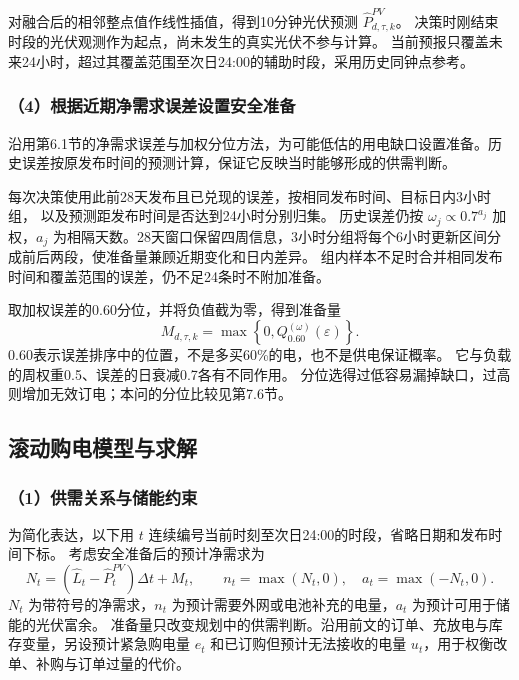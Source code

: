 对融合后的相邻整点值作线性插值，得到10分钟光伏预测 $\widehat P^{PV}_{d,\tau,k}$。
决策时刚结束时段的光伏观测作为起点，尚未发生的真实光伏不参与计算。
当前预报只覆盖未来24小时，超过其覆盖范围至次日24:00的辅助时段，采用历史同钟点参考。

\subsubsection*{（4）根据近期净需求误差设置安全准备}

沿用第6.1节的净需求误差与加权分位方法，为可能低估的用电缺口设置准备。历史误差按原发布时间的预测计算，保证它反映当时能够形成的供需判断。

每次决策使用此前28天发布且已兑现的误差，按相同发布时间、目标日内3小时组，
以及预测距发布时间是否达到24小时分别归集。
历史误差仍按 $\omega_j\propto0.7^{a_j}$ 加权，$a_j$ 为相隔天数。28天窗口保留四周信息，3小时分组将每个6小时更新区间分成前后两段，使准备量兼顾近期变化和日内差异。
组内样本不足时合并相同发布时间和覆盖范围的误差，仍不足24条时不附加准备。

取加权误差的0.60分位，并将负值截为零，得到准备量
\begin{equation}
M_{d,\tau,k}=\max\left\{0,Q_{0.60}^{(\omega)}(\varepsilon)\right\}.
\end{equation}
0.60表示误差排序中的位置，不是多买60\%的电，也不是供电保证概率。
它与负载的周权重0.5、误差的日衰减0.7各有不同作用。
分位选得过低容易漏掉缺口，过高则增加无效订电；本问的分位比较见第7.6节。

\subsection{滚动购电模型与求解}

\subsubsection*{（1）供需关系与储能约束}

为简化表达，以下用 $t$ 连续编号当前时刻至次日24:00的时段，省略日期和发布时间下标。
考虑安全准备后的预计净需求为
\begin{equation}
N_t=(\widehat L_t-\widehat P^{PV}_t)\Delta t+M_t,\qquad
n_t=\max(N_t,0),\quad a_t=\max(-N_t,0).
\end{equation}
$N_t$ 为带符号的净需求，$n_t$ 为预计需要外网或电池补充的电量，$a_t$ 为预计可用于储能的光伏富余。
准备量只改变规划中的供需判断。沿用前文的订单、充放电与库存变量，另设预计紧急购电量 $e_t$ 和已订购但预计无法接收的电量 $u_t$，用于权衡改单、补购与订单过量的代价。



